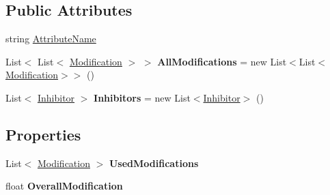 \subsection*{Public Attributes}
\begin{DoxyCompactItemize}
\item 
string \hyperlink{class_r_p_g_object_1_1_attribut_modification_helper_a7d284a483e95ba8c7de9f536f50fd395}{Attribute\+Name}
\item 
\hypertarget{class_r_p_g_object_1_1_attribut_modification_helper_a16d781421788573ab938f850f57bda0a}{}List$<$ List$<$ \hyperlink{class_r_p_g_object_1_1_attribut_modification_helper_1_1_modification}{Modification} $>$ $>$ {\bfseries All\+Modifications} = new List$<$List$<$\hyperlink{class_r_p_g_object_1_1_attribut_modification_helper_1_1_modification}{Modification}$>$$>$ ()\label{class_r_p_g_object_1_1_attribut_modification_helper_a16d781421788573ab938f850f57bda0a}

\item 
\hypertarget{class_r_p_g_object_1_1_attribut_modification_helper_a6d8cb9272270fecb0d7aaf8df7ef184d}{}List$<$ \hyperlink{class_r_p_g_object_1_1_attribut_modification_helper_1_1_inhibitor}{Inhibitor} $>$ {\bfseries Inhibitors} = new List$<$\hyperlink{class_r_p_g_object_1_1_attribut_modification_helper_1_1_inhibitor}{Inhibitor}$>$ ()\label{class_r_p_g_object_1_1_attribut_modification_helper_a6d8cb9272270fecb0d7aaf8df7ef184d}

\end{DoxyCompactItemize}
\subsection*{Properties}
\begin{DoxyCompactItemize}
\item 
\hypertarget{class_r_p_g_object_1_1_attribut_modification_helper_a420f306ba1d89f6dbfa12f98f7a86a23}{}List$<$ \hyperlink{class_r_p_g_object_1_1_attribut_modification_helper_1_1_modification}{Modification} $>$ {\bfseries Used\+Modifications}\label{class_r_p_g_object_1_1_attribut_modification_helper_a420f306ba1d89f6dbfa12f98f7a86a23}

\item 
\hypertarget{class_r_p_g_object_1_1_attribut_modification_helper_ad17e7c9081ae8e2e5c33dfa4bd114f9b}{}float {\bfseries Overall\+Modification}\label{class_r_p_g_object_1_1_attribut_modification_helper_ad17e7c9081ae8e2e5c33dfa4bd114f9b}

\end{DoxyCompactItemize}


